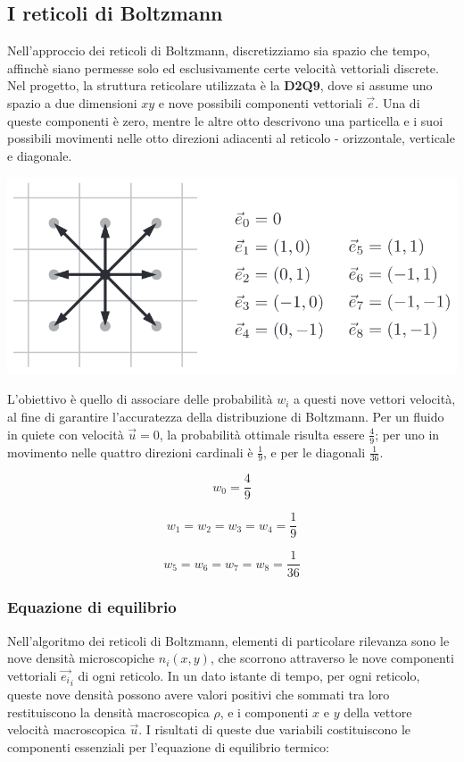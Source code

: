 \documentclass[12pt]{article}
\begin{document}
\subsection{I reticoli di Boltzmann}
Nell'approccio dei reticoli di Boltzmann, discretizziamo sia spazio che tempo, affinchè siano permesse solo ed esclusivamente certe velocità vettoriali discrete.
Nel progetto, la struttura reticolare utilizzata è la \textbf{D2Q9}, dove si assume uno spazio a due dimensioni \( xy \) e nove possibili componenti vettoriali \( \vec{e} \).
Una di queste componenti è zero, mentre le altre otto descrivono una particella e i suoi possibili movimenti nelle otto direzioni adiacenti al reticolo - orizzontale, verticale e diagonale.

\begin{center}
    \includegraphics[scale=0.5]{1}
\end{center}


L'obiettivo è quello di associare delle probabilità \(w_i\) a questi nove vettori velocità, al fine di garantire l'accuratezza della distribuzione di Boltzmann.
Per un fluido in quiete con velocità \( \vec{u} = 0 \), la probabilità ottimale risulta essere \(\frac{4}{9}\); per uno in movimento nelle quattro direzioni cardinali è \(\frac{1}{9}\), e per le diagonali \(\frac{1}{36}\).

\begin{equation}
    w_0 = \frac{4}{9}
\end{equation}

\begin{equation}
    w_1 = w_2 = w_3 = w_4 = \frac{1}{9}
\end{equation}

\begin{equation}
    w_5 = w_6 = w_7 = w_8 = \frac{1}{36}
\end{equation}


\subsubsection{Equazione di equilibrio}
\label{sec:desc}
Nell'algoritmo dei reticoli di Boltzmann, elementi di particolare rilevanza sono le nove densità microscopiche \(n_i(x,y)\), che scorrono attraverso le nove componenti vettoriali \(\vec{e_i}_i\) di ogni reticolo.
In un dato istante di tempo, per ogni reticolo, queste nove densità possono avere valori positivi che sommati tra loro restituiscono la densità macroscopica \(\rho\), e i componenti \(x\) e \(y\) della vettore velocità macroscopica \(\vec{u}\).
I risultati di queste due variabili costituiscono le componenti essenziali per l'equazione di equilibrio termico:
\end{document}

